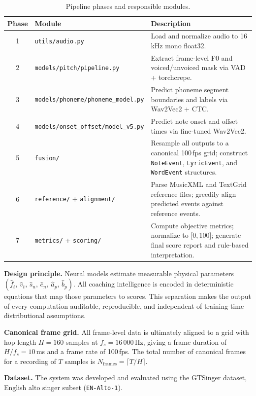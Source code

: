 \documentclass[11pt,letterpaper]{article}
\newcommand{\fh}{\hat{f}}
\newcommand{\vh}{\hat{v}}
\newcommand{\sh}{\hat{s}}
\newcommand{\eh}{\hat{e}}
\newcommand{\ah}{\hat{a}}
\newcommand{\bh}{\hat{b}}
\begin{document}
\begin{table}[h]
  \centering
  \caption{Pipeline phases and responsible modules.}
  \renewcommand{\arraystretch}{1.25}
  \begin{tabular}{@{}clp{9cm}@{}}
    \toprule
    Phase & Module & Description \\
    \midrule
    1 & \texttt{utils/audio.py}
      & Load and normalize audio to 16\,kHz mono float32. \\
    2 & \texttt{models/pitch/pipeline.py}
      & Extract frame-level F0 and voiced/unvoiced mask via VAD + torchcrepe. \\
    3 & \texttt{models/phoneme/phoneme\_model.py}
      & Predict phoneme segment boundaries and labels via Wav2Vec2 + CTC. \\
    4 & \texttt{models/onset\_offset/model\_v5.py}
      & Predict note onset and offset times via fine-tuned Wav2Vec2. \\
    5 & \texttt{fusion/}
      & Resample all outputs to a canonical 100\,fps grid; construct
        \texttt{NoteEvent}, \texttt{LyricEvent}, and \texttt{WordEvent}
        structures. \\
    6 & \texttt{reference/} + \texttt{alignment/}
      & Parse MusicXML and TextGrid reference files; greedily align predicted
        events against reference events. \\
    7 & \texttt{metrics/} + \texttt{scoring/}
      & Compute objective metrics; normalize to [0,\,100]; generate final
        score report and rule-based interpretation. \\
    \bottomrule
  \end{tabular}
\end{table}

\textbf{Design principle.}
Neural models estimate measurable physical parameters
$(\fh_t,\,\vh_t,\,\sh_n,\,\eh_n,\,\ah_p,\,\bh_p)$.
All coaching intelligence is encoded in deterministic equations that map those
parameters to scores.
This separation makes the output of every computation auditable, reproducible,
and independent of training-time distributional assumptions.

\textbf{Canonical frame grid.}
All frame-level data is ultimately aligned to a grid with hop length
$H = 160$ samples at $f_s = 16\,000$\,Hz, giving a frame duration of
$H/f_s = 10$\,ms and a frame rate of 100\,fps.
The total number of canonical frames for a recording of $T$ samples is
$N_\text{frames} = \lceil T / H \rceil$.

\textbf{Dataset.}
The system was developed and evaluated using the GTSinger dataset, English
alto singer subset (\texttt{EN-Alto-1}).
\end{document}
